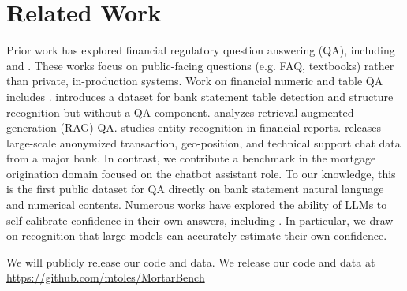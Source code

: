 \documentclass[11pt]{article}
\begin{document}
\section{Related Work}
Prior work has explored financial regulatory question answering (QA), including \citet{sohn2021global} and \citet{chen2024fintextqa}.
These works focus on public-facing questions (e.g. FAQ, textbooks) rather than private, in-production systems.
Work on financial numeric and table QA includes \citet{zhu2021tat, chen2021finqa, reddy2024docfinqa, islam2023financebench}.
\citet{trivedi2024tabsniper} introduces a dataset for bank statement table detection and structure recognition but without a QA component.
\citet{choi2025finder} analyzes retrieval-augmented generation (RAG) QA.
\citet{loukas2022finer} studies entity recognition in financial reports.
\citet{mollaev2025multimodal} releases large-scale anonymized transaction, geo-position, and technical support chat data from a major bank.
In contrast, we contribute a benchmark in the mortgage origination domain focused on the chatbot assistant role.
To our knowledge, this is the first public dataset for QA directly on bank statement natural language and numerical contents.
Numerous works have explored the ability of LLMs to self-calibrate confidence in their own answers, including \citet{manakul2023selfcheckgpt, zhu2023calibration, kapoor2024calibration, kuhn2023semantic, kadavath2022language}.
In particular, we draw on  recognition that large models can accurately estimate their own confidence.


\makeatletter
\ifacl@anonymize
We will publicly release our code and data.
\else
We release our code and data at \href{https://github.com/mtoles/MortarBench}{https://github.com/mtoles/MortarBench}
\fi
\makeatother




\end{document}
